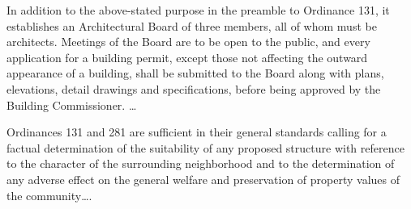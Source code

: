 In addition to the above-stated purpose in the preamble to Ordinance 131, it
establishes an Architectural Board of three members, all of whom must be
architects. Meetings of the Board are to be open to the public, and every
application for a building permit, except those not affecting the outward
appearance of a building, shall be submitted to the Board along with plans,
elevations, detail drawings and specifications, before being approved by the
Building Commissioner. \ldots

Ordinances 131 and 281 are sufficient in their general standards calling for a
factual determination of the suitability of any proposed structure with
reference to the character of the surrounding neighborhood and to the
determination of any adverse effect on the general welfare and preservation of
property values of the community\ldots .

